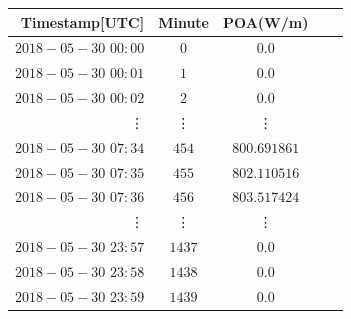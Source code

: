 


\begin{table}[h]

\centering

\begin{tabular}{r|cccc} \hline\hline

Timestamp[UTC] & Minute & POA(W/m) \\ \hline
$2018-05-30$ $00:00$ &  $0$ & $0.0$\\
$2018-05-30$ $00:01$ &  $1$ & $0.0$\\
$2018-05-30$ $00:02$ &  $2$ & $0.0$\\
\vdots & \vdots & \vdots \\
$2018-05-30$ $ 07:34$ & $454$ & $800.691861$\\
$2018-05-30 $ $07:35$ & $455$ & $802.110516$\\
$2018-05-30 $ $07:36$ & $456$ & $803.517424$\\
\vdots & \vdots & \vdots \\
$2018-05-30$ $ 23:57$ & $1437$ & $0.0$\\
$2018-05-30 $ $23:58$ & $1438$ & $0.0$\\
$2018-05-30 $ $23:59$ & $1439$ & $0.0$\\

\hline\hline
\end{tabular}
\label{table_poa_simulated_format}
\end{table}


